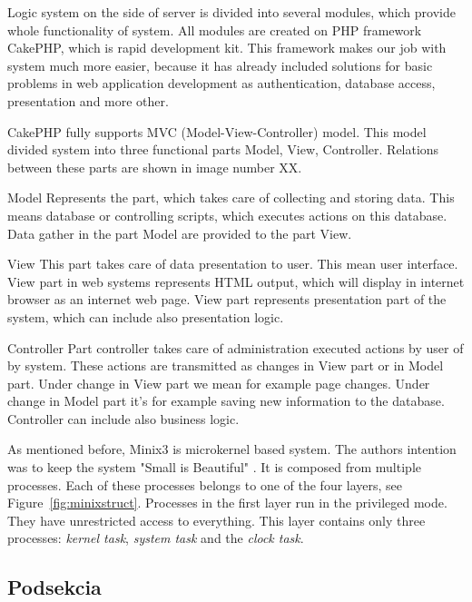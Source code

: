 \documentclass{iitsrc}[2006/14/02]
\newcommand\fig[4]{%
	\begin{figure}[h]
	\begin{center}
	\texttt{[image: \#2]}
	~\\%
	\caption{#4}
	\label{#3}
	\end{center}
	\end{figure}
}
\begin{document}
Logic system on the side of server is divided into several modules, which provide whole functionality of system. All modules are created on PHP framework CakePHP,  which is rapid development kit. This framework makes our job with system much more easier, because it has already included solutions for basic problems in web application development as authentication, database access, presentation and more other.

CakePHP fully supports MVC (Model-View-Controller) model. This model divided system into three functional parts Model, View, Controller. Relations between these parts are shown in image number XX.

Model
Represents the part, which takes care of collecting and storing data. This means database or controlling scripts, which executes actions on this database. Data gather in the part Model are provided to the part View.

View
This part takes care of data presentation to user. This mean user interface.  View part in web systems represents HTML output, which will display in internet browser as an internet web page. View part represents presentation part of the system, which can include also presentation logic.

Controller
Part controller takes care of administration executed actions by user of by system. These actions are transmitted as changes in View part or in Model part. Under change in View part we mean for example page changes. Under change in Model part it’s for example saving new information to the database. Controller can include also business logic.

 
As mentioned before, Minix3 is microkernel based system. The authors intention was to keep the system "Small is Beautiful" \cite[page 17]{osdesign}.
It is composed from multiple processes. Each of these processes belongs to one of the four layers, see Figure~\ref{fig:minixstruct}. Processes in the first layer run in the privileged mode. They have unrestricted access to everything. This layer contains only three processes: {\em kernel task}, {\em system task} and the {\em clock task}.

%
\subsection{Podsekcia}

      
\end{document}
